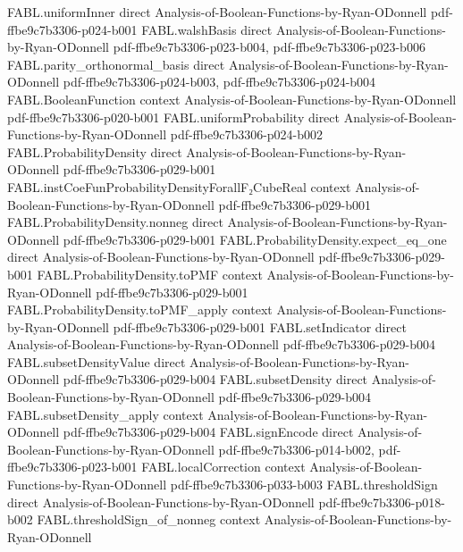 \begin{theorem}
  {FABL.uniformInner}
  {direct}
  {Analysis-of-Boolean-Functions-by-Ryan-ODonnell}
  {pdf-ffbe9c7b3306-p024-b001}
\proofstep
  {FABL.walshBasis}
  {direct}
  {Analysis-of-Boolean-Functions-by-Ryan-ODonnell}
  {pdf-ffbe9c7b3306-p023-b004,
    pdf-ffbe9c7b3306-p023-b006}
\proofstep
  {FABL.parity_orthonormal_basis}
  {direct}
  {Analysis-of-Boolean-Functions-by-Ryan-ODonnell}
  {pdf-ffbe9c7b3306-p024-b003,
    pdf-ffbe9c7b3306-p024-b004}
\proofstep
  {FABL.BooleanFunction}
  {context}
  {Analysis-of-Boolean-Functions-by-Ryan-ODonnell}
  {pdf-ffbe9c7b3306-p020-b001}
\proofstep
  {FABL.uniformProbability}
  {direct}
  {Analysis-of-Boolean-Functions-by-Ryan-ODonnell}
  {pdf-ffbe9c7b3306-p024-b002}
\proofstep
  {FABL.ProbabilityDensity}
  {direct}
  {Analysis-of-Boolean-Functions-by-Ryan-ODonnell}
  {pdf-ffbe9c7b3306-p029-b001}
\proofstep
  {FABL.instCoeFunProbabilityDensityForallF₂CubeReal}
  {context}
  {Analysis-of-Boolean-Functions-by-Ryan-ODonnell}
  {pdf-ffbe9c7b3306-p029-b001}
\proofstep
  {FABL.ProbabilityDensity.nonneg}
  {direct}
  {Analysis-of-Boolean-Functions-by-Ryan-ODonnell}
  {pdf-ffbe9c7b3306-p029-b001}
\proofstep
  {FABL.ProbabilityDensity.expect_eq_one}
  {direct}
  {Analysis-of-Boolean-Functions-by-Ryan-ODonnell}
  {pdf-ffbe9c7b3306-p029-b001}
\proofstep
  {FABL.ProbabilityDensity.toPMF}
  {context}
  {Analysis-of-Boolean-Functions-by-Ryan-ODonnell}
  {pdf-ffbe9c7b3306-p029-b001}
\proofstep
  {FABL.ProbabilityDensity.toPMF_apply}
  {context}
  {Analysis-of-Boolean-Functions-by-Ryan-ODonnell}
  {pdf-ffbe9c7b3306-p029-b001}
\proofstep
  {FABL.setIndicator}
  {direct}
  {Analysis-of-Boolean-Functions-by-Ryan-ODonnell}
  {pdf-ffbe9c7b3306-p029-b004}
\proofstep
  {FABL.subsetDensityValue}
  {direct}
  {Analysis-of-Boolean-Functions-by-Ryan-ODonnell}
  {pdf-ffbe9c7b3306-p029-b004}
\proofstep
  {FABL.subsetDensity}
  {direct}
  {Analysis-of-Boolean-Functions-by-Ryan-ODonnell}
  {pdf-ffbe9c7b3306-p029-b004}
\proofstep
  {FABL.subsetDensity_apply}
  {context}
  {Analysis-of-Boolean-Functions-by-Ryan-ODonnell}
  {pdf-ffbe9c7b3306-p029-b004}
\proofstep
  {FABL.signEncode}
  {direct}
  {Analysis-of-Boolean-Functions-by-Ryan-ODonnell}
  {pdf-ffbe9c7b3306-p014-b002,
    pdf-ffbe9c7b3306-p023-b001}
\proofstep
  {FABL.localCorrection}
  {context}
  {Analysis-of-Boolean-Functions-by-Ryan-ODonnell}
  {pdf-ffbe9c7b3306-p033-b003}
\proofstep
  {FABL.thresholdSign}
  {direct}
  {Analysis-of-Boolean-Functions-by-Ryan-ODonnell}
  {pdf-ffbe9c7b3306-p018-b002}
\proofstep
  {FABL.thresholdSign_of_nonneg}
  {context}
  {Analysis-of-Boolean-Functions-by-Ryan-ODonnell}

\end{theorem}
